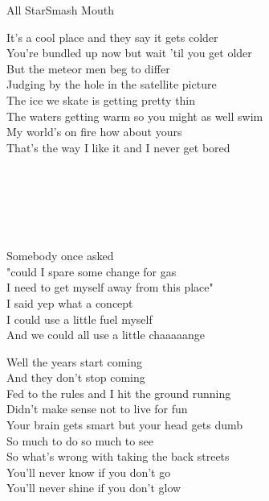 \documentclass[a4paper,11pt,french]{article}
\begin{document}
\begin{Song}{All Star}{Smash Mouth}
\begin{multicols}{2}
\begin{Verse}
It's a cool place and they say it gets colder\\
You’re bundled up now but wait 'til you get older\\
But the meteor men beg to differ\\
Judging by the hole in the satellite picture\\
The ice we skate is getting pretty thin\\
The waters getting warm so you might as well swim\\
My world's on fire how about yours\\
That's the way I like it and I never get bored\\
\end{Verse}
\espaceInterStrophe

\tochorus \\ 
\espaceInterStrophe

\\ 
\espaceInterStrophe

\tochorus\\
\columnbreak

\begin{Verse}
Somebody once asked\\
"could I spare some change for gas\\
I need to get myself away from this place"\\
I said yep what a concept\\
I could use a little fuel myself\\
And we could all use a little chaaaaange\\
\end{Verse}
\espaceInterStrophe

\begin{PreChorus}
Well the years start coming\\
And they don't stop coming\\
Fed to the rules and I hit the ground running\\
Didn't make sense not to live for fun\\
Your brain gets smart but your head gets dumb\\
So much to do so much to see\\
So what's wrong with taking the back streets\\
You'll never know if you don't go\\
You'll never shine if you don't glow\\
\end{PreChorus}
\espaceInterStrophe


\end{multicols}
\end{Song}
\end{document}
